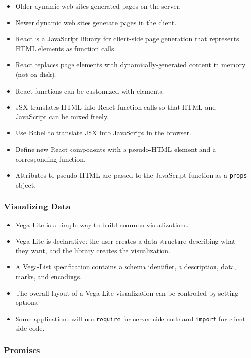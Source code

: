 \begin{itemize}
\tightlist
\item
  Older dynamic web sites generated pages on the server.
\item
  Newer dynamic web sites generate pages in the client.
\item
  React is a JavaScript library for client-side page generation that
  represents HTML elements as function calls.
\item
  React replaces page elements with dynamically-generated content in
  memory (not on disk).
\item
  React functions can be customized with elements.
\item
  JSX translates HTML into React function calls so that HTML and
  JavaScript can be mixed freely.
\item
  Use Babel to translate JSX into JavaScript in the browser.
\item
  Define new React components with a pseudo-HTML element and a
  corresponding function.
\item
  Attributes to pseudo-HTML are passed to the JavaScript function as a
  \texttt{props} object.
\end{itemize}

\subsubsection{\texorpdfstring{\protect\hyperlink{s:vis}{Visualizing
Data}}{Visualizing Data}}\label{null}

\begin{itemize}
\tightlist
\item
  Vega-Lite is a simple way to build common visualizations.
\item
  Vega-Lite is declarative: the user creates a data structure describing
  what they want, and the library creates the visualization.
\item
  A Vega-List specification contains a schema identifier, a description,
  data, marks, and encodings.
\item
  The overall layout of a Vega-Lite visualization can be controlled by
  setting options.
\item
  Some applications will use \texttt{require} for server-side code and
  \texttt{import} for client-side code.
\end{itemize}

\subsubsection{\texorpdfstring{\protect\hyperlink{s:promises}{Promises}}{Promises}}\label{null}

